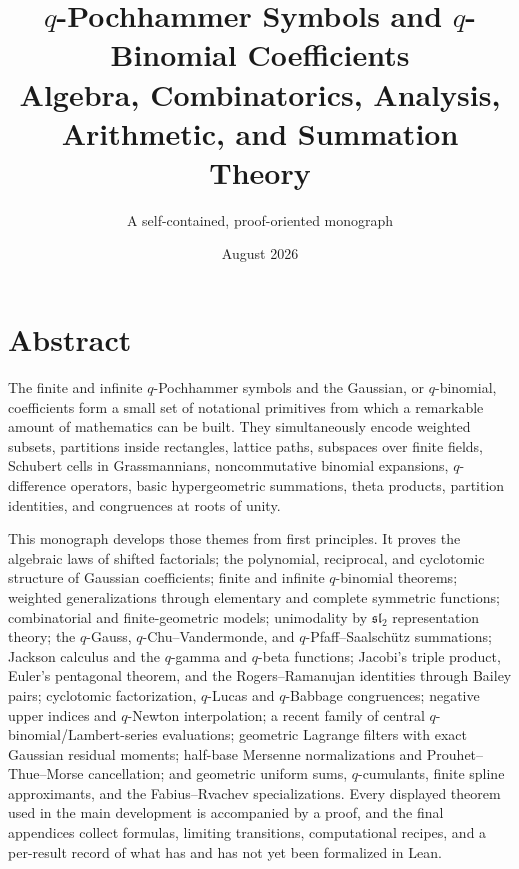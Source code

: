 \documentclass[11pt,a4paper,oneside,openany]{book}
\title{\Huge\bfseries $q$-Pochhammer Symbols and $q$-Binomial Coefficients\\[8pt]
\Large Algebra, Combinatorics, Analysis, Arithmetic, and Summation Theory}
\author{A self-contained, proof-oriented monograph}
\date{August 2026}
\theoremstyle{definition}
\theoremstyle{remark}
\begin{document}
\frontmatter
\hypersetup{pageanchor=false}
\maketitle
\hypersetup{pageanchor=true}

\chapter*{Abstract}
The finite and infinite $q$-Pochhammer symbols and the Gaussian, or $q$-binomial, coefficients form a small set of notational primitives from which a remarkable amount of mathematics can be built.  They simultaneously encode weighted subsets, partitions inside rectangles, lattice paths, subspaces over finite fields, Schubert cells in Grassmannians, noncommutative binomial expansions, $q$-difference operators, basic hypergeometric summations, theta products, partition identities, and congruences at roots of unity.

This monograph develops those themes from first principles.  It proves the algebraic laws of shifted factorials; the polynomial, reciprocal, and cyclotomic structure of Gaussian coefficients; finite and infinite $q$-binomial theorems; weighted generalizations through elementary and complete symmetric functions; combinatorial and finite-geometric models; unimodality by $\mathfrak{sl}_2$ representation theory; the $q$-Gauss, $q$-Chu--Vandermonde, and $q$-Pfaff--Saalsch\"utz summations; Jackson calculus and the $q$-gamma and $q$-beta functions; Jacobi's triple product, Euler's pentagonal theorem, and the Rogers--Ramanujan identities through Bailey pairs; cyclotomic factorization, $q$-Lucas and $q$-Babbage congruences; negative upper indices and $q$-Newton interpolation; a recent family of central $q$-binomial/Lambert-series evaluations; geometric Lagrange filters with exact Gaussian residual moments; half-base Mersenne normalizations and Prouhet--Thue--Morse cancellation; and geometric uniform sums, $q$-cumulants, finite spline approximants, and the Fabius--Rvachev specializations.  Every displayed theorem used in the main development is accompanied by a proof, and the final appendices collect formulas, limiting transitions, computational recipes, and a per-result record of what has and has not yet been formalized in Lean.
\end{document}
